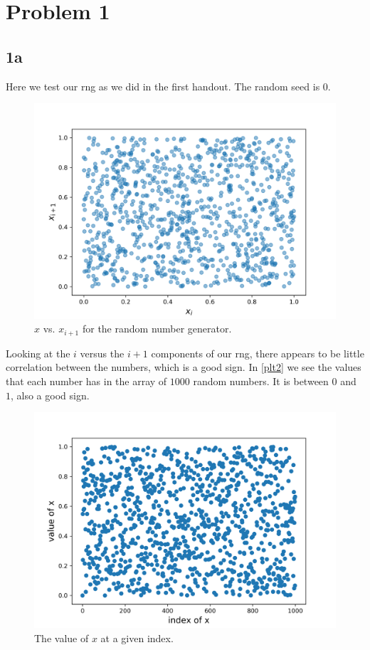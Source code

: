 \section{Problem 1}
\subsection{1a}



Here we test our rng as we did in the first handout. The random seed is $0$. 
\begin{figure}[h!]
    \centering
    \includegraphics[width=0.9\linewidth]{./plots/x_x_1.png}
    \caption{$x$ vs. $x_{i+1}$ for the random number generator.}
    \label{plt1}
\end{figure}
Looking at the $i$ versus the $i+1$ components of our rng, there appears
to be little correlation between the numbers, which is a good sign. In
\autoref{plt2} we see the values that each number has in the array of 
$1000$ random numbers. It is between $0$ and $1$, also a good sign.
\begin{figure}[h!]
    \centering
    \includegraphics[width=0.9\linewidth]{./plots/xval_xind.png}
    \caption{The value of $x$ at a given index.}
    \label{plt2}
\end{figure}
